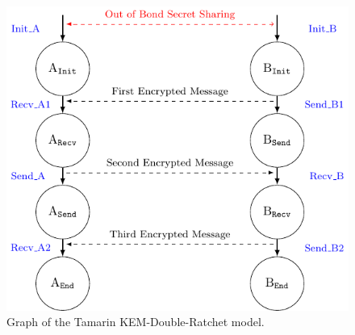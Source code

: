\begin{figure}[ht!]
\centering
\includegraphics[scale=0.85]{Graph_DR.pdf}
    \caption{Graph of the Tamarin KEM-Double-Ratchet model.}
    \label{DRGraph}
\end{figure}

